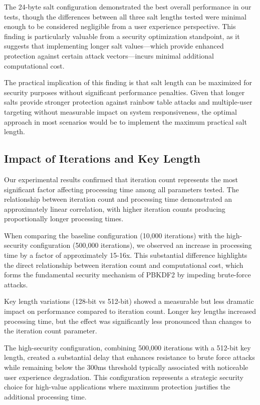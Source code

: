 \documentclass[11pt,a4paper]{article}
\begin{document}
The 24-byte salt configuration demonstrated the best overall performance in our tests, though the differences between all three salt lengths tested were minimal enough to be considered negligible from a user experience perspective. This finding is particularly valuable from a security optimization standpoint, as it suggests that implementing longer salt values—which provide enhanced protection against certain attack vectors—incurs minimal additional computational cost.

The practical implication of this finding is that salt length can be maximized for security purposes without significant performance penalties. Given that longer salts provide stronger protection against rainbow table attacks and multiple-user targeting without measurable impact on system responsiveness, the optimal approach in most scenarios would be to implement the maximum practical salt length.

\subsection{Impact of Iterations and Key Length}
Our experimental results confirmed that iteration count represents the most significant factor affecting processing time among all parameters tested. The relationship between iteration count and processing time demonstrated an approximately linear correlation, with higher iteration counts producing proportionally longer processing times.

When comparing the baseline configuration (10,000 iterations) with the high-security configuration (500,000 iterations), we observed an increase in processing time by a factor of approximately 15-16x. This substantial difference highlights the direct relationship between iteration count and computational cost, which forms the fundamental security mechanism of PBKDF2 by impeding brute-force attacks.

Key length variations (128-bit vs 512-bit) showed a measurable but less dramatic impact on performance compared to iteration count. Longer key lengths increased processing time, but the effect was significantly less pronounced than changes to the iteration count parameter.

The high-security configuration, combining 500,000 iterations with a 512-bit key length, created a substantial delay that enhances resistance to brute force attacks while remaining below the 300ms threshold typically associated with noticeable user experience degradation. This configuration represents a strategic security choice for high-value applications where maximum protection justifies the additional processing time.
\end{document}
